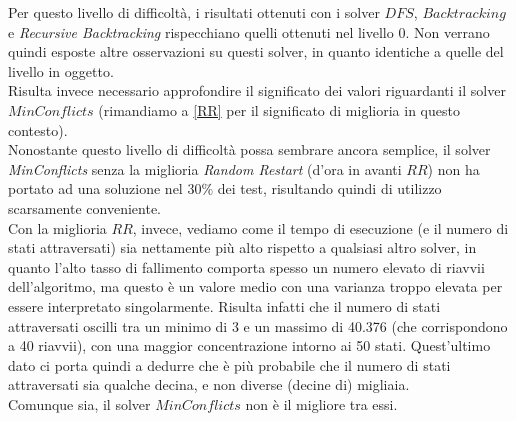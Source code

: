 Per questo livello di difficoltà, i risultati ottenuti con i solver $DFS$, $Backtracking$ e \textit{Recursive Backtracking} rispecchiano quelli ottenuti nel livello 0. Non verrano quindi esposte altre osservazioni su questi solver, in quanto identiche a quelle del livello in oggetto.\\


Risulta invece necessario approfondire il significato dei valori riguardanti il solver $MinConflicts$ (rimandiamo a \ref{RR} per il significato di miglioria in questo contesto).\\
Nonostante questo livello di difficoltà possa sembrare ancora semplice, il solver \textit{MinConflicts} senza la miglioria \textit{Random Restart} (d'ora in avanti $RR$) non ha portato ad una soluzione nel $30\%$ dei test, risultando quindi di utilizzo scarsamente conveniente. \\
Con la miglioria $RR$, invece, vediamo come il tempo di esecuzione (e il numero di stati attraversati) sia nettamente più alto rispetto a qualsiasi altro solver, in quanto l'alto tasso di fallimento comporta spesso un numero elevato di riavvii dell'algoritmo, ma questo è un valore medio con una varianza troppo elevata per essere interpretato singolarmente. Risulta infatti che il numero di stati attraversati oscilli tra un minimo di 3 e un massimo di 40.376 (che corrispondono a 40 riavvii), con una maggior concentrazione intorno ai 50 stati. Quest'ultimo dato ci porta quindi a dedurre che è più probabile che il numero di stati attraversati sia qualche decina, e non diverse (decine di) migliaia.\\
Comunque sia, il solver $MinConflicts$ non è il migliore tra essi.


